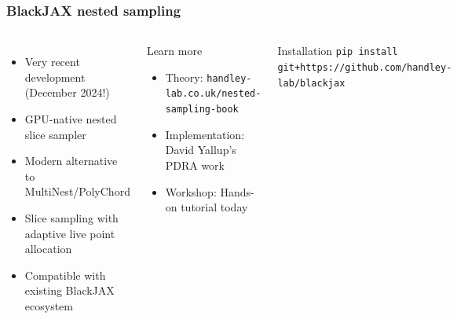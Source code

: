 \documentclass[aspectratio=169]{beamer}
\begin{document}
\begin{frame}
    \frametitle{BlackJAX nested sampling}
    \begin{columns}
        \begin{itemize}
            \item Very recent development (December 2024!)
            \item GPU-native nested slice sampler
            \item Modern alternative to MultiNest/PolyChord
            \item Slice sampling with adaptive live point allocation
            \item Compatible with existing BlackJAX ecosystem
        \end{itemize}
        \begin{block}{Learn more}
            \begin{itemize}
                \item Theory: \texttt{handley-lab.co.uk/nested-sampling-book}
                \item Implementation: David Yallup's PDRA work
                \item Workshop: Hands-on tutorial today
            \end{itemize}
        \end{block}
        \begin{block}{Installation}
            \texttt{pip install git+https://github.com/handley-lab/blackjax}
        \end{block}
        \includegraphics[width=\textwidth]{people/david_yallup.jpg}

\end{columns}
\end{frame}
\end{document}
